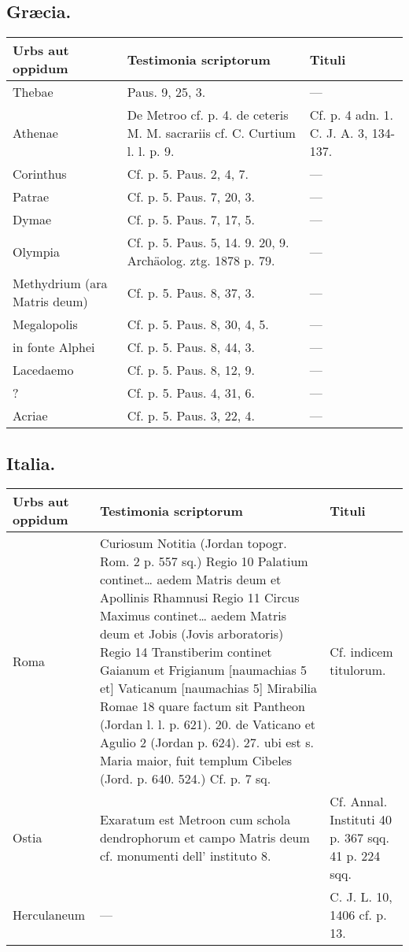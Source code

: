 \documentclass[a4paper, 11pt, oneside, polutonikogreek, german]{article}
\begin{document}
\subsection{Græcia.}
\begin{table}[H]
    \centering
    \begin{tabular}{|p{30mm}|p{30mm}|p{60mm}|}
    \hline
        Urbs aut oppidum & Testimonia scriptorum & Tituli \\ \hline
        Thebae & Paus. 9, 25, 3. & --- \\ \hline
        Athenae & De Metroo cf. p. 4. de ceteris M. M. sacrariis cf. C. Curtium l. l. p. 9. & Cf. p. 4 adn. 1. C. J. A. 3, 134-137. \\ \hline
        Corinthus & Cf. p. 5. Paus. 2, 4, 7. & --- \\ \hline
        Patrae & Cf. p. 5. Paus. 7, 20, 3. & --- \\ \hline
        Dymae & Cf. p. 5. Paus. 7, 17, 5. & --- \\ \hline
        Olympia & Cf. p. 5. Paus. 5, 14. 9. 20, 9. Archäolog. ztg. 1878 p. 79. & --- \\ \hline
        Methydrium (ara Matris deum) & Cf. p. 5. Paus. 8, 37, 3. & --- \\ \hline
        Megalopolis & Cf. p. 5. Paus. 8, 30, 4, 5. & --- \\ \hline
        in fonte Alphei & Cf. p. 5. Paus. 8, 44, 3. & --- \\ \hline
        Lacedaemo & Cf. p. 5. Paus. 8, 12, 9. & --- \\ \hline
        [Messene] ? & Cf. p. 5. Paus. 4, 31, 6. & --- \\ \hline
        Acriae & Cf. p. 5. Paus. 3, 22, 4. & --- \\ \hline
    \end{tabular}
\end{table}
\subsection{Italia.}
\begin{table}[H]
    \centering
    \begin{tabular}{|p{30mm}|p{40mm}|p{40mm}|}
    \hline
        Urbs aut oppidum & Testimonia scriptorum & Tituli \\ \hline
        Roma & Curiosum Notitia (Jordan topogr. Rom. 2 p. 557 sq.) Regio 10 Palatium continet… aedem Matris deum et Apollinis Rhamnusi Regio 11 Circus Maximus continet… aedem Matris deum et Jobis (Jovis arboratoris) Regio 14 Transtiberim continet Gaianum et Frigianum [naumachias 5 et] Vaticanum [naumachias 5] Mirabilia Romae 18 quare factum sit Pantheon (Jordan l. l. p. 621). 20. de Vaticano et Agulio 2 (Jordan p. 624). 27. ubi est s. Maria maior, fuit templum Cibeles (Jord. p. 640. 524.) Cf. p. 7 sq. & Cf. indicem titulorum. \\ \hline
        Ostia & Exaratum est Metroon cum schola dendrophorum et campo Matris deum cf. monumenti dell’ instituto 8. & Cf. Annal. Instituti 40 p. 367 sqq. 41 p. 224 sqq. \\ \hline
        Herculaneum & --- & C. J. L. 10, 1406 cf. p. 13. \\ \hline
    \end{tabular}
\end{table}
\end{document}
